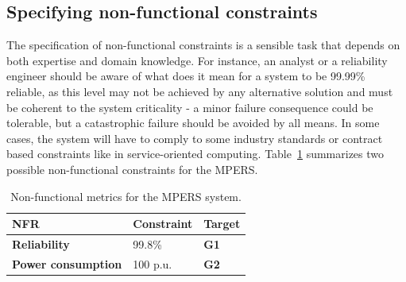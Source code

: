 %
%
%
%

\subsection{Specifying non-functional constraints}

The specification of non-functional constraints is a sensible task that depends on both expertise and domain knowledge. For instance, an analyst or a reliability engineer should be aware of what does it mean for a system to be 99.99\% reliable, as this level may not be achieved by any alternative solution and must be coherent to the system criticality - a minor failure consequence could be tolerable, but a catastrophic failure should be avoided by all means. In some cases, the system will have to comply to some industry standards or contract based constraints like in service-oriented computing. Table~\ref{tab:MPERS_NFR} summarizes two possible non-functional constraints for the MPERS.
\medskip

\begin{table}[h]
{\renewcommand{\arraystretch}{1.5}
\begin{tabularx}{\textwidth}{@{}XXX@{}}
\toprule
\textbf{NFR}               & \textbf{Constraint} & \textbf{Target}        \\ \midrule
\textbf{Reliability}       & 99.8\%            & \textbf{G1} \\
\textbf{Power consumption} & 100 p.u.            & \textbf{G2}          \\ \bottomrule
\end{tabularx}
}
\caption{Non-functional metrics for the MPERS system.}
\label{tab:MPERS_NFR}
\end{table}

